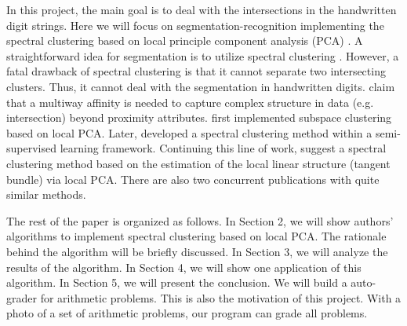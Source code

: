 In this project, the main goal is to deal with the intersections in the handwritten digit strings.
Here we will focus on segmentation-recognition implementing the spectral clustering based on local principle component analysis (PCA) \citep{arias2017}.
A straightforward idea for segmentation is to utilize spectral clustering \citep{ng2002}.
However, a fatal drawback of spectral clustering is that it cannot separate two intersecting clusters.
Thus, it cannot deal with the segmentation in handwritten digits.
\citet{shashua2006} claim that a multiway affinity is needed to capture complex structure in data (e.g. intersection) beyond proximity attributes.
\citet{fan2006} first implemented subspace clustering based on local PCA.
Later, \citet{goldberg2009} developed a spectral clustering method within a semi-supervised learning framework.
Continuing this line of work, \citep{arias2011} suggest a spectral clustering method based on the estimation of the local linear structure (tangent bundle) via local PCA.
There are also two concurrent publications \citep{wang2011, gong2012} with quite similar methods.

The rest of the paper is organized as follows.
In Section 2, we will show authors' algorithms to implement spectral clustering based on local PCA.
The rationale behind the algorithm will be briefly discussed.
In Section 3, we will analyze the results of the algorithm.
In Section 4, we will show one application of this algorithm.
In Section 5, we will present the conclusion.
We will build a auto-grader for arithmetic problems.
This is also the motivation of this project.
With a photo of a set of arithmetic problems, our program can grade all problems.  

